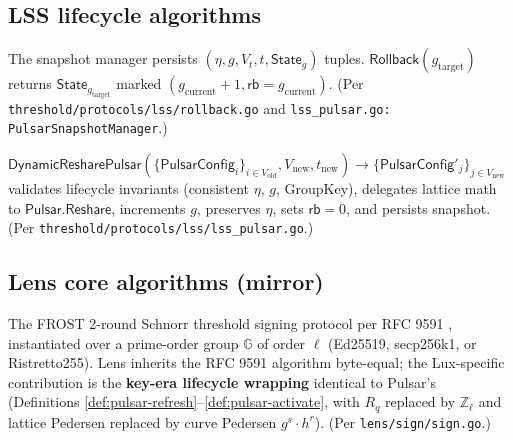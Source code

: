 \subsection*{LSS lifecycle algorithms}

\begin{definition}
\label{def:lss-snap}
The snapshot manager persists $(\eta, g, V_t, t, \mathsf{State}_g)$
tuples. $\mathsf{Rollback}(g_{\text{target}})$ returns
$\mathsf{State}_{g_{\text{target}}}$ marked
$(g_{\text{current}}+1, \mathsf{rb} = g_{\text{current}})$. (Per
\texttt{threshold/protocols/lss/rollback.go} and
\texttt{lss\_pulsar.go: PulsarSnapshotManager}.)
\end{definition}

\begin{definition}
\label{def:lss-pulsar-adapter}
$\mathsf{DynamicResharePulsar}(\{\mathsf{PulsarConfig}_i\}_{i \in V_{\text{old}}},
V_{\text{new}}, t_{\text{new}}) \to
\{\mathsf{PulsarConfig}'_j\}_{j \in V_{\text{new}}}$
validates lifecycle invariants (consistent $\eta$, $g$, GroupKey),
delegates lattice math to $\mathsf{Pulsar.Reshare}$, increments $g$,
preserves $\eta$, sets $\mathsf{rb}=0$, and persists snapshot. (Per
\texttt{threshold/protocols/lss/lss\_pulsar.go}.)
\end{definition}

\subsection*{Lens core algorithms (mirror)}

\begin{definition}
\label{def:lens-sign}
The FROST 2-round Schnorr threshold signing protocol per RFC 9591
\cite{rfc9591}, instantiated over a prime-order group $\mathbb{G}$ of
order $\ell$ (Ed25519, secp256k1, or Ristretto255). Lens inherits the
RFC 9591 algorithm byte-equal; the Lux-specific contribution is the
\textbf{key-era lifecycle wrapping} identical to Pulsar's
(Definitions \ref{def:pulsar-refresh}--\ref{def:pulsar-activate}, with
$R_q$ replaced by $\mathbb{Z}_\ell$ and lattice Pedersen replaced by
curve Pedersen $g^s \cdot h^r$). (Per \texttt{lens/sign/sign.go}.)
\end{definition}
